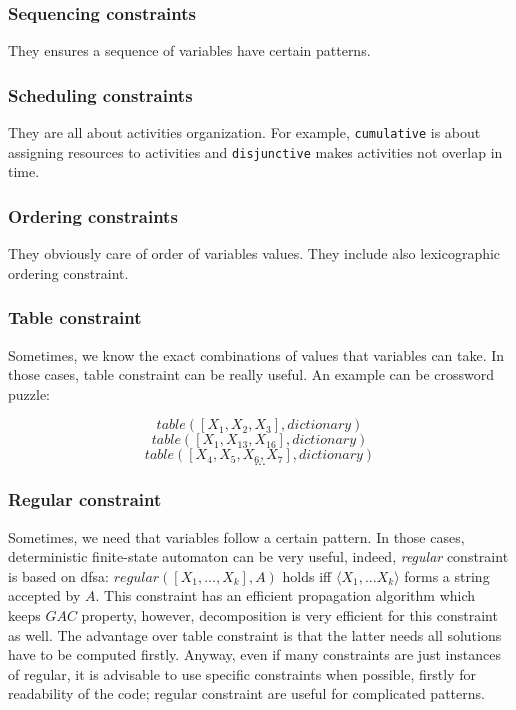 \documentclass[10pt,a4paper]{article}
\begin{document}
\subsubsection{Sequencing constraints}
They ensures a sequence of variables have certain patterns.

\subsubsection{Scheduling constraints}
They are all about activities organization. For example, \texttt{cumulative} is
about assigning resources to activities and \texttt{disjunctive} makes
activities not overlap in time.

\subsubsection{Ordering constraints}
They obviously care of order of variables values. They include also
lexicographic ordering constraint.

\subsubsection{Table constraint}
Sometimes, we know the exact combinations of values that variables can take.
In those cases, table constraint can be really useful. An example can be
crossword puzzle:

\[ table([X_1, X_2, X_3], dictionary) \]
\[ table([X_1, X_{13}, X_{16}], dictionary) \]
\[ table([X_4, X_5, X_6, X_7], dictionary) \]
\[ ... \]

\subsubsection{Regular constraint}
Sometimes, we need that variables follow a certain pattern. In those cases,
deterministic finite-state automaton can be very useful, indeed,
\textit{regular} constraint is based on dfsa: $regular([X_1, ..., X_k], A)$
holds iff $\langle X_1, ... X_k \rangle$ forms a string accepted by $A$. This
constraint has an efficient propagation algorithm which keeps $GAC$ property,
however, decomposition is very efficient for this constraint as well. The
advantage over table constraint is that the latter needs all solutions have to
be computed firstly. Anyway, even if many constraints are just instances of
regular, it is advisable to use specific constraints when possible, firstly for
readability of the code; regular constraint are useful for complicated patterns.
\end{document}
